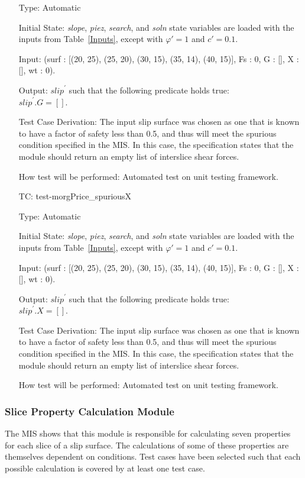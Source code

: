 \documentclass[12pt, titlepage]{article}
\newcounter{utestnum} %
\begin{document}
\begin{enumerate}[label=TC\arabic*:,ref={\arabic*}]
	Type: Automatic
	
	Initial State: \textit{slope}, \textit{piez}, \textit{search}, and 
	\textit{soln} state variables are loaded with the inputs from 
	Table~\ref{Inputs}, except with $\varphi' = 1$ and $c' = 0.1$.
	
	Input: (surf : [(20, 25), (25, 20), (30, 15), (35, 14), (40, 15)], Fs : 0, 
	G : [], X : [], wt : 0).
	
	Output: $\textit{slip}^\prime$ such that the following predicate holds 
	true:\\ 
	$\textit{slip}^\prime.\textit{G} = []$.
	
	Test Case Derivation: The input slip surface was chosen as one that is 
	known to have a factor of safety less than 0.5, and thus will meet the 
	spurious condition specified in the MIS. In this case, the specification 
	states that the module should return an empty list of interslice shear 
	forces.
	
	How test will be performed: Automated test on unit testing framework.
	
	\item [TC\refstepcounter{utestnum}\theutestnum: 
	\label{TC_MorgPriceSpuriousX}] 
	test-morgPrice\_spuriousX
	
	Type: Automatic
	
	Initial State: \textit{slope}, \textit{piez}, \textit{search}, and 
	\textit{soln} state variables are loaded with the inputs from 
	Table~\ref{Inputs}, except with $\varphi' = 1$ and $c' = 0.1$.
	
	Input: (surf : [(20, 25), (25, 20), (30, 15), (35, 14), (40, 15)], Fs : 0, 
	G : [], X : [], wt : 0).
	
	Output: $\textit{slip}^\prime$ such that the following predicate holds 
	true:\\ 
	$\textit{slip}^\prime.\textit{X} = []$.
	
	Test Case Derivation: The input slip surface was chosen as one that is 
	known to have a factor of safety less than 0.5, and thus will meet the 
	spurious condition specified in the MIS. In this case, the specification 
	states that the module should return an empty list of interslice shear 
	forces.
	
	How test will be performed: Automated test on unit testing framework.
	
\end{enumerate}

\subsubsection{Slice Property Calculation Module}
The MIS shows that this module is responsible for calculating seven properties 
for each slice of a slip surface. The calculations of some of these properties 
are themselves dependent on conditions. Test cases have been selected such that 
each possible calculation is covered by at least one test case. 
\end{document}
